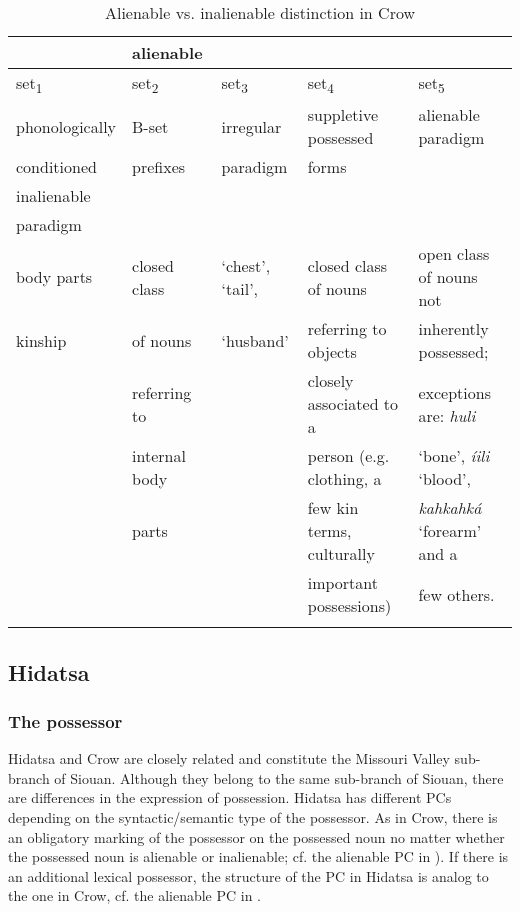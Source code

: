 \documentclass[output=paper]{LSP/langsci}
\begin{document}
\begin{table}
\caption{Alienable vs. inalienable distinction in Crow} \label{crowalienability}
\begin{footnotesize}
\begin{tabular}[h!]{ l l l l l }
\lsptoprule
\multicolumn{4}{c |}{inalienable } & alienable \\
\midrule
set\textsubscript{1} & set\textsubscript{2}	& set\textsubscript{3} & set\textsubscript{4} & set\textsubscript{5} \\
\hline
phonologically & 	B-set & irregular & suppletive possessed & alienable paradigm \\
conditioned & prefixes & paradigm & forms & \\
inalienable & & & \\
paradigm & & & \\
\hline
body parts & closed class & `chest', `tail', & closed class of nouns & open class of nouns not \\
kinship & of nouns & `husband'	& referring to objects & inherently possessed; \\
& referring to & & closely associated to a & exceptions are: \textit{huli}  \\
& internal body & & person (e.g. clothing, a & `bone', \textit{íili} `blood', \\
& parts & & few kin terms, culturally &  \textit{kahkahká} `forearm' and a \\
& & & important possessions) & few others. \\
\lspbottomrule
\end{tabular}
\end{footnotesize}
\end{table}

\subsection{Hidatsa}
\subsubsection{The possessor}
Hidatsa and Crow are closely related and constitute the Missouri Valley sub-branch of Siouan. Although they belong to the same sub-branch of Siouan, there are differences in the expression of possession. Hidatsa has different PCs depending on the syntactic/semantic type of the possessor. As in Crow, there is an obligatory marking of the possessor on the possessed noun no matter whether the possessed noun is alienable or inalienable; cf. the alienable PC in ). If there is an additional lexical possessor, the structure of the PC in Hidatsa is analog to the one in Crow, cf. the alienable PC in .
\end{document}
